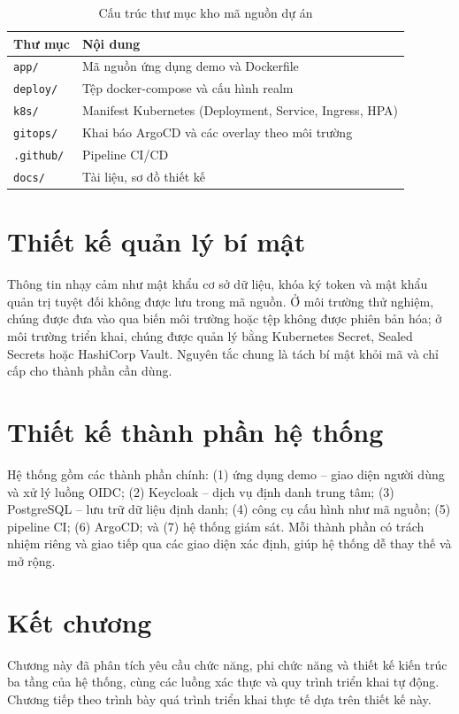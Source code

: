 \begin{table}[htbp]
\centering
\caption{Cấu trúc thư mục kho mã nguồn dự án}
\label{tab:repo}
\small
\begin{tabular}{p{3.6cm} p{9.2cm}}
\toprule
\textbf{Thư mục} & \textbf{Nội dung}\\
\midrule
\texttt{app/} & Mã nguồn ứng dụng demo và Dockerfile\\
\texttt{deploy/} & Tệp docker-compose và cấu hình realm\\
\texttt{k8s/} & Manifest Kubernetes (Deployment, Service, Ingress, HPA)\\
\texttt{gitops/} & Khai báo ArgoCD và các overlay theo môi trường\\
\texttt{.github/} & Pipeline CI/CD\\
\texttt{docs/} & Tài liệu, sơ đồ thiết kế\\
\bottomrule
\end{tabular}
\end{table}

\section{Thiết kế quản lý bí mật}
\label{sec:secrets}

Thông tin nhạy cảm như mật khẩu cơ sở dữ liệu, khóa ký token và mật khẩu quản
trị tuyệt đối không được lưu trong mã nguồn. Ở môi trường thử nghiệm, chúng
được đưa vào qua biến môi trường hoặc tệp không được phiên bản hóa; ở môi
trường triển khai, chúng được quản lý bằng Kubernetes Secret, Sealed Secrets
hoặc HashiCorp Vault. Nguyên tắc chung là tách bí mật khỏi mã và chỉ cấp cho
thành phần cần dùng.

\section{Thiết kế thành phần hệ thống}
\label{sec:thanhphan}

Hệ thống gồm các thành phần chính: (1) ứng dụng demo -- giao diện người dùng và
xử lý luồng OIDC; (2) Keycloak -- dịch vụ định danh trung tâm; (3) PostgreSQL
-- lưu trữ dữ liệu định danh; (4) công cụ cấu hình như mã nguồn; (5) pipeline
CI; (6) ArgoCD; và (7) hệ thống giám sát. Mỗi thành phần có trách nhiệm riêng
và giao tiếp qua các giao diện xác định, giúp hệ thống dễ thay thế và mở rộng.

\section{Kết chương}

Chương này đã phân tích yêu cầu chức năng, phi chức năng và thiết kế kiến trúc
ba tầng của hệ thống, cùng các luồng xác thực và quy trình triển khai tự động.
Chương tiếp theo trình bày quá trình triển khai thực tế dựa trên thiết kế này.
